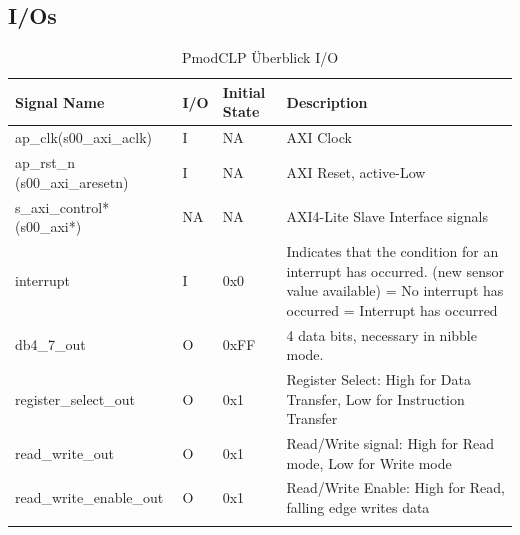 \subsection{I/Os}
\begin{longtable}{|p{4cm}|p{1cm}|p{2cm}|p{6.6cm}|}
\hline
\textbf{Signal Name} & \textbf{I/O} & \textbf{Initial State} & \textbf{Description} \\
\hline
ap\_clk(s00\_axi\_aclk) & I & NA & AXI Clock \\
\hline
ap\_rst\_n (s00\_axi\_aresetn) & I & NA & AXI Reset, active-Low \\
\hline
s\_axi\_control* (s00\_axi*) & NA & NA & AXI4-Lite Slave Interface signals \\
\hline
interrupt & I & 0x0 & Indicates that the condition for an interrupt has occurred. (new sensor value available)
\newline 0 = No interrupt has occurred
\newline 1 = Interrupt has occurred \\
\hline
db4\_7\_out & O & 0xFF & 4 data bits, necessary in nibble mode. \\
\hline
register\_select\_out & O & 0x1 & Register Select: High for Data Transfer, Low for Instruction Transfer \\
\hline
read\_write\_out & O & 0x1 & Read/Write signal: High for Read mode, Low for Write mode \\
\hline
read\_write\_enable\_out & O & 0x1 & Read/Write Enable: High for Read, falling edge writes data \\
\hline
\caption{PmodCLP Überblick I/O}
\end{longtable}

